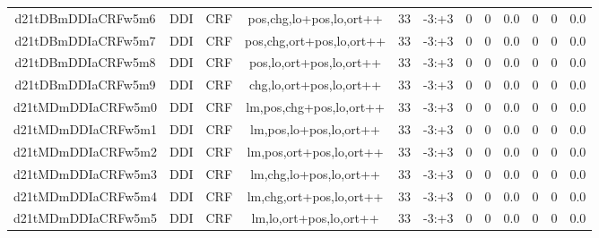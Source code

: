 \documentclass[a4paper]{article}
\begin{document}
\begin{landscape}
\begin{center}
\begin{tabular}{ |c|c|c|c|c|c|c|c|c|c|c|c|}
 
 	
 	\small{ d21tDBmDDIaCRFw5m6 } & \small{ DDI} & \small{  CRF }  & pos,chg,lo+pos,lo,ort++  &  33 &  \small{  -3:+3 }  &  0 & 0 & 0.0  &  0 & 0 & 0.0 \\
 	

 
 	
 	\small{ d21tDBmDDIaCRFw5m7 } & \small{ DDI} & \small{  CRF }  & pos,chg,ort+pos,lo,ort++  &  33 &  \small{  -3:+3 }  &  0 & 0 & 0.0  &  0 & 0 & 0.0 \\
 	

 
 	
 	\small{ d21tDBmDDIaCRFw5m8 } & \small{ DDI} & \small{  CRF }  & pos,lo,ort+pos,lo,ort++  &  33 &  \small{  -3:+3 }  &  0 & 0 & 0.0  &  0 & 0 & 0.0 \\
 	

 
 	
 	\small{ d21tDBmDDIaCRFw5m9 } & \small{ DDI} & \small{  CRF }  & chg,lo,ort+pos,lo,ort++  &  33 &  \small{  -3:+3 }  &  0 & 0 & 0.0  &  0 & 0 & 0.0 \\
 	

 
 	
 	\small{ d21tMDmDDIaCRFw5m0 } & \small{ DDI} & \small{  CRF }  & lm,pos,chg+pos,lo,ort++  &  33 &  \small{  -3:+3 }  &  0 & 0 & 0.0  &  0 & 0 & 0.0 \\
 	

 
 	
 	\small{ d21tMDmDDIaCRFw5m1 } & \small{ DDI} & \small{  CRF }  & lm,pos,lo+pos,lo,ort++  &  33 &  \small{  -3:+3 }  &  0 & 0 & 0.0  &  0 & 0 & 0.0 \\
 	

 
 	
 	\small{ d21tMDmDDIaCRFw5m2 } & \small{ DDI} & \small{  CRF }  & lm,pos,ort+pos,lo,ort++  &  33 &  \small{  -3:+3 }  &  0 & 0 & 0.0  &  0 & 0 & 0.0 \\
 	

 
 	
 	\small{ d21tMDmDDIaCRFw5m3 } & \small{ DDI} & \small{  CRF }  & lm,chg,lo+pos,lo,ort++  &  33 &  \small{  -3:+3 }  &  0 & 0 & 0.0  &  0 & 0 & 0.0 \\
 	

 
 	
 	\small{ d21tMDmDDIaCRFw5m4 } & \small{ DDI} & \small{  CRF }  & lm,chg,ort+pos,lo,ort++  &  33 &  \small{  -3:+3 }  &  0 & 0 & 0.0  &  0 & 0 & 0.0 \\
 	

 
 	
 	\small{ d21tMDmDDIaCRFw5m5 } & \small{ DDI} & \small{  CRF }  & lm,lo,ort+pos,lo,ort++  &  33 &  \small{  -3:+3 }  &  0 & 0 & 0.0  &  0 & 0 & 0.0 \\
 	


\end{tabular}
\end{center}
\end{landscape}
\end{document}
